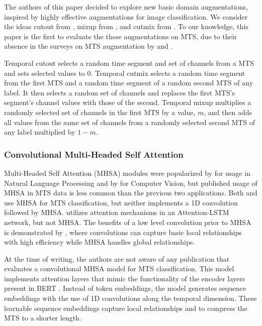 \documentclass[letterpaper]{article} %
\begin{document}
The authors of this paper decided to explore new basic domain augmentations, inspired by highly effective augmentations for image classification. We consider the ideas cutout from \cite{devries2017improved}, mixup from \cite{zhang2017mixup}, and cutmix from \cite{yun2019cutmix}. To our knowledge, this paper is the first to evaluate the these augmentations on MTS, due to their absence in the surveys on MTS augmentation by \cite{wen2020time} and \cite{iwana2021empirical}.

Temporal cutout selects a random time segment and set of channels from a MTS and sets selected values to 0. Temporal cutmix selects a random time segment from the first MTS and a random time segment of a random second MTS of any label. It then selects a random set of channels and replaces the first MTS's segment's channel values with those of the second. Temporal mixup multiplies a randomly selected set of channels in the first MTS by a value, $m$, and then adds all values from the same set of channels from a randomly selected second MTS of any label multiplied by $1 - m$.


\subsubsection{Convolutional Multi-Headed Self Attention}

Multi-Headed Self Attention (MHSA) modules were popularized by \cite{devlin2018bert} for usage in Natural Language Processing and by \cite{dosovitskiy2020image} for Computer Vision, but published usage of MHSA in MTS data is less common than the previous two applications. Both \cite{song2018attend} and \cite{russwurm2020self}  use MHSA for MTS classification, but neither implements a 1D convolution followed by MHSA. \cite{karim2019multivariate} utilizes attention mechanisms in an Attention-LSTM network, but not MHSA. The benefits of a low level convolution prior to MHSA is demonstrated by \cite{gulati2020conformer}, where convolutions can capture basic local relationships with high efficiency while MHSA handles global relationships.

At the time of writing, the authors are not aware of any publication that evaluates a convolutional MHSA model for MTS classification. This model implements attention layers that mimic the functionality of the encoder layers present in BERT \cite{devlin2018bert}. Instead of token embeddings, the model generates sequence embeddings with the use of 1D convolutions along the temporal dimension. These learnable sequence embeddings capture local relationships and to compress the MTS to a shorter length.
\end{document}
